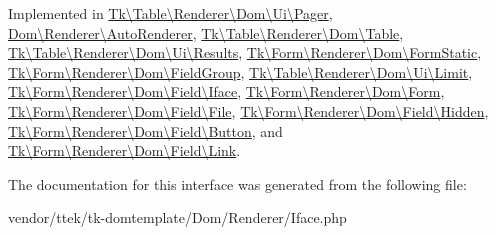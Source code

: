 Implemented in \hyperlink{classTk_1_1Table_1_1Renderer_1_1Dom_1_1Ui_1_1Pager_ae40067db74fa55f76345f0ba9eef3f56}{Tk\textbackslash{}\+Table\textbackslash{}\+Renderer\textbackslash{}\+Dom\textbackslash{}\+Ui\textbackslash{}\+Pager}, \hyperlink{classDom_1_1Renderer_1_1AutoRenderer_a71ad96ed156aa79d45058b3bf372e73d}{Dom\textbackslash{}\+Renderer\textbackslash{}\+Auto\+Renderer}, \hyperlink{classTk_1_1Table_1_1Renderer_1_1Dom_1_1Table_aeef7366176a250dbee759e9ff78062ee}{Tk\textbackslash{}\+Table\textbackslash{}\+Renderer\textbackslash{}\+Dom\textbackslash{}\+Table}, \hyperlink{classTk_1_1Table_1_1Renderer_1_1Dom_1_1Ui_1_1Results_a6cb4921fdb6a62b96a35d80c780df122}{Tk\textbackslash{}\+Table\textbackslash{}\+Renderer\textbackslash{}\+Dom\textbackslash{}\+Ui\textbackslash{}\+Results}, \hyperlink{classTk_1_1Form_1_1Renderer_1_1Dom_1_1FormStatic_a26fa1ebf33c3504b3f599adf1070e043}{Tk\textbackslash{}\+Form\textbackslash{}\+Renderer\textbackslash{}\+Dom\textbackslash{}\+Form\+Static}, \hyperlink{classTk_1_1Form_1_1Renderer_1_1Dom_1_1FieldGroup_afd18726c000171d11abfd6044d1e3b01}{Tk\textbackslash{}\+Form\textbackslash{}\+Renderer\textbackslash{}\+Dom\textbackslash{}\+Field\+Group}, \hyperlink{classTk_1_1Table_1_1Renderer_1_1Dom_1_1Ui_1_1Limit_a7afabb245a6701c7ebd6f35fa2ffe704}{Tk\textbackslash{}\+Table\textbackslash{}\+Renderer\textbackslash{}\+Dom\textbackslash{}\+Ui\textbackslash{}\+Limit}, \hyperlink{classTk_1_1Form_1_1Renderer_1_1Dom_1_1Field_1_1Iface_a77359df4fad53376f97b6a192410c54b}{Tk\textbackslash{}\+Form\textbackslash{}\+Renderer\textbackslash{}\+Dom\textbackslash{}\+Field\textbackslash{}\+Iface}, \hyperlink{classTk_1_1Form_1_1Renderer_1_1Dom_1_1Form_a2b67b6b33d1cffdffc04010dad181b93}{Tk\textbackslash{}\+Form\textbackslash{}\+Renderer\textbackslash{}\+Dom\textbackslash{}\+Form}, \hyperlink{classTk_1_1Form_1_1Renderer_1_1Dom_1_1Field_1_1File_adc2d7a4f70c408469660a243ec791acc}{Tk\textbackslash{}\+Form\textbackslash{}\+Renderer\textbackslash{}\+Dom\textbackslash{}\+Field\textbackslash{}\+File}, \hyperlink{classTk_1_1Form_1_1Renderer_1_1Dom_1_1Field_1_1Hidden_a482c59511558e1e4bdf83d943fc2800d}{Tk\textbackslash{}\+Form\textbackslash{}\+Renderer\textbackslash{}\+Dom\textbackslash{}\+Field\textbackslash{}\+Hidden}, \hyperlink{classTk_1_1Form_1_1Renderer_1_1Dom_1_1Field_1_1Button_a7fb360221146282195b769db9ef4d814}{Tk\textbackslash{}\+Form\textbackslash{}\+Renderer\textbackslash{}\+Dom\textbackslash{}\+Field\textbackslash{}\+Button}, and \hyperlink{classTk_1_1Form_1_1Renderer_1_1Dom_1_1Field_1_1Link_a30a4fe16a4d31b92bcc6d1cdb6505d22}{Tk\textbackslash{}\+Form\textbackslash{}\+Renderer\textbackslash{}\+Dom\textbackslash{}\+Field\textbackslash{}\+Link}.



The documentation for this interface was generated from the following file\+:\begin{DoxyCompactItemize}
\item 
vendor/ttek/tk-\/domtemplate/\+Dom/\+Renderer/Iface.\+php\end{DoxyCompactItemize}
